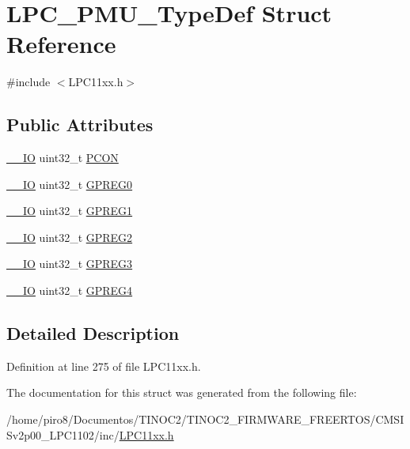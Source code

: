 \hypertarget{struct_l_p_c___p_m_u___type_def}{}\section{L\+P\+C\+\_\+\+P\+M\+U\+\_\+\+Type\+Def Struct Reference}
\label{struct_l_p_c___p_m_u___type_def}


{\ttfamily \#include $<$L\+P\+C11xx.\+h$>$}

\subsection*{Public Attributes}
\begin{DoxyCompactItemize}
\item 
\hyperlink{group___c_m_s_i_s__core__definitions_gaec43007d9998a0a0e01faede4133d6be}{\+\_\+\+\_\+\+IO} uint32\+\_\+t \hyperlink{group___l_p_c11xx___definitions_gace88fd565967e0b8a698ed05aa6a08f9}{P\+C\+ON}
\item 
\hyperlink{group___c_m_s_i_s__core__definitions_gaec43007d9998a0a0e01faede4133d6be}{\+\_\+\+\_\+\+IO} uint32\+\_\+t \hyperlink{group___l_p_c11xx___definitions_ga8aa25492f1cc07e7dd2a3458cb1bb466}{G\+P\+R\+E\+G0}
\item 
\hyperlink{group___c_m_s_i_s__core__definitions_gaec43007d9998a0a0e01faede4133d6be}{\+\_\+\+\_\+\+IO} uint32\+\_\+t \hyperlink{group___l_p_c11xx___definitions_gae1077907bc2cb229a78dd4349de107f7}{G\+P\+R\+E\+G1}
\item 
\hyperlink{group___c_m_s_i_s__core__definitions_gaec43007d9998a0a0e01faede4133d6be}{\+\_\+\+\_\+\+IO} uint32\+\_\+t \hyperlink{group___l_p_c11xx___definitions_ga56d0d66c3216217926792c465ba59557}{G\+P\+R\+E\+G2}
\item 
\hyperlink{group___c_m_s_i_s__core__definitions_gaec43007d9998a0a0e01faede4133d6be}{\+\_\+\+\_\+\+IO} uint32\+\_\+t \hyperlink{group___l_p_c11xx___definitions_ga8206f79423746cfc3789c0a039139e02}{G\+P\+R\+E\+G3}
\item 
\hyperlink{group___c_m_s_i_s__core__definitions_gaec43007d9998a0a0e01faede4133d6be}{\+\_\+\+\_\+\+IO} uint32\+\_\+t \hyperlink{group___l_p_c11xx___definitions_ga1232f5a7193adf2f2e5b1fd6ec943889}{G\+P\+R\+E\+G4}
\end{DoxyCompactItemize}


\subsection{Detailed Description}


Definition at line 275 of file L\+P\+C11xx.\+h.



The documentation for this struct was generated from the following file\+:\begin{DoxyCompactItemize}
\item 
/home/piro8/\+Documentos/\+T\+I\+N\+O\+C2/\+T\+I\+N\+O\+C2\+\_\+\+F\+I\+R\+M\+W\+A\+R\+E\+\_\+\+F\+R\+E\+E\+R\+T\+O\+S/\+C\+M\+S\+I\+Sv2p00\+\_\+\+L\+P\+C1102/inc/\hyperlink{_l_p_c11xx_8h}{L\+P\+C11xx.\+h}\end{DoxyCompactItemize}
